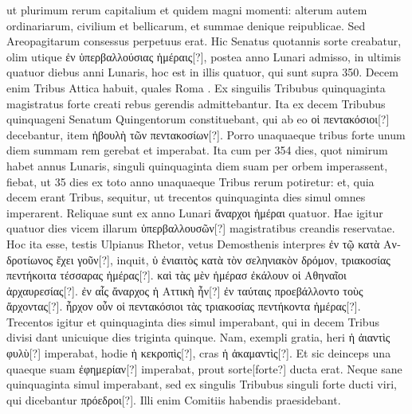 ut plurimum rerum capitalium et quidem magni momenti: alterum autem
ordinariarum, civilium et bellicarum, et summae denique reipublicae.
Sed Areopagitarum consessus perpetuus erat.
Hic Senatus
quotannis sorte creabatur, olim utique \textgreek{ἐν ὑπερβαλλούσιας ἡμέραις[?]},
postea anno Lunari admisso, in ultimis quatuor diebus anni
Lunaris, hoc est in illis quatuor, qui sunt supra 350.
Decem
enim Tribus Attica habuit, quales Roma .
Ex singuilis Tribubus
quinquaginta magistratus forte creati rebus gerendis admittebantur.
Ita ex decem Tribubus quinquageni Senatum Quingentorum
constituebant, qui ab eo \textgreek{οἱ πεντακόσιοι[?]} decebantur,
 item \textgreek{ἡβουλὴ
τῶν πεντακοσίων[?]}.
Porro unaquaeque tribus forte unum diem summam
rem gerebat et imperabat.
Ita cum per 354 dies, quot nimirum
habet annus Lunaris, singuli quinquaginta diem suam per
orbem imperassent, fiebat, ut 35 dies ex toto anno unaquaeque Tribus
rerum potiretur: et, quia decem erant Tribus, sequitur, ut trecentos
quinquaginta dies simul omnes imperarent.
Reliquae sunt ex anno
Lunari \textgreek{ἄναρχοι ἡμέραι} quatuor.
Hae igitur quatuor dies vicem illarum
\textgreek{ὑπερβαλλουσῶν[?]} magistratibus creandis reservatae.
Hoc ita esse, testis Ulpianus
Rhetor, vetus Demosthenis interpres
 \textgreek{ἐν τῷ κατὰ Ανδροτίωνος ἔχει
γοῦν[?]}, inquit, \textgreek{ὑ ἐνιαιτὸς κατὰ τὸν σεληνιακὸν δρόμον,
 τριακοσίας πεντήκοιτα τέσσαρας
ἡμέρας[?]}.
\textgreek{καὶ τὰς μὲν  ἡμέρασ ἐκάλουν οἱ Αθηναῖοι
 ἀρχαυρεσίας[?]}.
\textgreek{ἐν
αἷς ἄναρχος ἡ Αττικὴ ἦν[?]}
\textgreek{ἐν ταύταις προεβάλλοντο τοὺς ἄρχοντας[?]}.
\textgreek{ἦρχον οὖν
οἱ πεντακόσιοι τὰς τριακοσίας πεντήκοντα ἡμέρας[?]}.
Trecentos igitur et
quinquaginta dies simul imperabant, qui in decem Tribus divisi dant
unicuique dies triginta quinque.
Nam, exempli gratia, heri \textgreek{ἡ ἀιαντὶς φυλὺ[?]}
imperabat, hodie \textgreek{ἡ κεκροπὶς[?]}, cras \textgreek{ἡ ἀκαμαντὶς[?]}.
Et sic deinceps una quaeque
suam \textgreek{ἐφημερίαν[?]} imperabat, prout sorte[forte?] ducta erat.
Neque sane quinquaginta
simul imperabant, sed ex singulis Tribubus singuli forte
ducti viri, qui dicebantur \textgreek{πρόεδροι[?]}.
Illi enim Comitiis habendis praesidebant.
